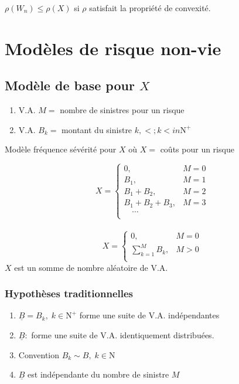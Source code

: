 \(\rho(W_n)\leq \rho(X)\) si \(\rho\) satisfait la propriété de
convexité.

\section{Modèles de risque non-vie}\label{modeles-de-risque-non-vie}


\subsection{Modèle de base pour \(X\)}\label{modele-de-base-pour-x}

\begin{enumerate}
\item V.A. $M=$ nombre de sinistres pour un risque  
\item V.A. $B_k=$ montant du sinistre $k,<;k<in\mathrm{N}^+$
\end{enumerate}

Modèle fréquence sévérité pour \(X\) où \(X=\) coûts pour un risque

\[
X=\begin{cases}
0,& M=0\\
B_1,& M=1\\
B_1+B_2,& M=2\\
B_1+B_2+B_3,& M=3\\
\quad\cdots\\
\end{cases}
\]\\
\[
X=\begin{cases}
0,& M=0\\
\sum^M_{k=1}B_k,& M > 0\\
\end{cases}
\] \(X\) est un somme de nombre aléatoire de V.A.

\subsubsection*{Hypothèses traditionnelles}\label{hypotheses-traditionnelles}

\begin{enumerate}
\item $\underline{B}=B_k,\;k\in \mathrm{N}^+$ forme une suite de V.A. indépendantes    
\item $\underline{B}:$ forme une suite de V.A. identiquement distribuées.   
\item Convention $B_k \sim B,\; k \in \mathrm{N}$   
\item $\underline{B}$ est indépendante du nombre de sinistre $M$    
\end{enumerate}

